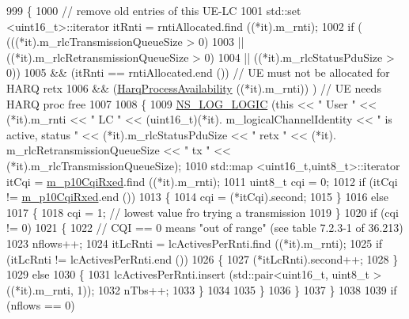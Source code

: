 \begin{DoxyCode}
999     \{
1000       \textcolor{comment}{// remove old entries of this UE-LC}
1001       std::set <uint16\_t>::iterator itRnti = rntiAllocated.find ((*it).m\_rnti);
1002       \textcolor{keywordflow}{if} ( (((*it).m\_rlcTransmissionQueueSize > 0)
1003             || ((*it).m\_rlcRetransmissionQueueSize > 0)
1004             || ((*it).m\_rlcStatusPduSize > 0))
1005            && (itRnti == rntiAllocated.end ())  \textcolor{comment}{// UE must not be allocated for HARQ retx}
1006            && (\hyperlink{classns3_1_1RrFfMacScheduler_af764ce5bbe2c2e0843064779816f1bc0}{HarqProcessAvailability} ((*it).m\_rnti))  ) \textcolor{comment}{// UE needs HARQ proc free}
1007 
1008         \{
1009           \hyperlink{group__logging_ga88acd260151caf2db9c0fc84997f45ce}{NS\_LOG\_LOGIC} (\textcolor{keyword}{this} << \textcolor{stringliteral}{" User "} << (*it).m\_rnti << \textcolor{stringliteral}{" LC "} << (uint16\_t)(*it).
      m\_logicalChannelIdentity << \textcolor{stringliteral}{" is active, status  "} << (*it).m\_rlcStatusPduSize << \textcolor{stringliteral}{" retx "} << (*it).
      m\_rlcRetransmissionQueueSize << \textcolor{stringliteral}{" tx "} << (*it).m\_rlcTransmissionQueueSize);
1010           std::map <uint16\_t,uint8\_t>::iterator itCqi = \hyperlink{classns3_1_1RrFfMacScheduler_aabdb8d68324faae8a279df6378d589b7}{m\_p10CqiRxed}.find ((*it).m\_rnti);
1011           uint8\_t cqi = 0;
1012           \textcolor{keywordflow}{if} (itCqi != \hyperlink{classns3_1_1RrFfMacScheduler_aabdb8d68324faae8a279df6378d589b7}{m\_p10CqiRxed}.end ())
1013             \{
1014               cqi = (*itCqi).second;
1015             \}
1016           \textcolor{keywordflow}{else}
1017             \{
1018               cqi = 1; \textcolor{comment}{// lowest value fro trying a transmission}
1019             \}
1020           \textcolor{keywordflow}{if} (cqi != 0)
1021             \{
1022               \textcolor{comment}{// CQI == 0 means "out of range" (see table 7.2.3-1 of 36.213)}
1023               nflows++;
1024               itLcRnti = lcActivesPerRnti.find ((*it).m\_rnti);
1025               \textcolor{keywordflow}{if} (itLcRnti != lcActivesPerRnti.end ())
1026                 \{
1027                   (*itLcRnti).second++;
1028                 \}
1029               \textcolor{keywordflow}{else}
1030                 \{
1031                   lcActivesPerRnti.insert (std::pair<uint16\_t, uint8\_t > ((*it).m\_rnti, 1));
1032                   nTbs++;
1033                 \}
1034 
1035             \}
1036         \}
1037     \}
1038 
1039   \textcolor{keywordflow}{if} (nflows == 0)

\end{DoxyCode}

